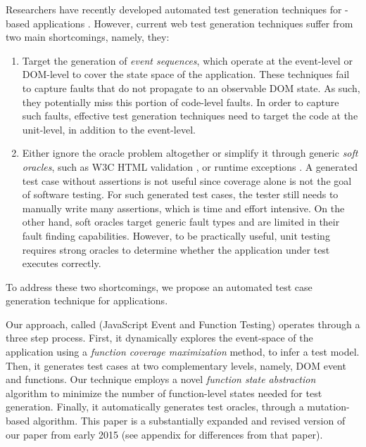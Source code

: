Researchers have recently developed automated test generation techniques for \javascript-based applications \cite{artzi:icse11, marchetto:search, tonella:icst08, mesbah:tse12, song:symb10}. However, current web test generation techniques suffer from two main  shortcomings, namely, they:

\begin{enumerate}%
\item Target the generation of \emph{event sequences}, which operate at the event-level or DOM-level to cover the state space of the application. These techniques fail to capture faults that  do not propagate to an observable DOM state. As such, they potentially miss this portion of code-level \javascript faults. In order to capture such faults, effective test generation techniques need to target the code at the \javascript unit-level, in addition to the event-level.
\item Either ignore the oracle problem altogether or simplify it through generic \emph{soft oracles}, such as  W3C HTML  validation \cite{artzi:icse11,mesbah:tse12}, or  \javascript runtime exceptions \cite{artzi:icse11}.
A generated test case without assertions is not useful since coverage alone is not the goal of software testing. For such generated test cases, the tester still needs to  manually write many assertions, which is time and effort intensive. 
On the other hand, soft oracles  target generic fault types and are limited in their fault finding capabilities.   %
However, to be practically useful, unit testing requires strong oracles  to determine whether the application under test executes correctly.
\end{enumerate}
To address these two shortcomings, we propose an automated test case  generation technique for \javascript applications. 

Our approach, called \tool (JavaScript Event and Function Testing) operates through a three step process. 
First, it dynamically explores the event-space of the application using a \emph{function coverage maximization} method, to infer a test model. Then, it generates test cases at two complementary levels, namely, DOM event and \javascript functions. Our technique employs a novel \emph{function state abstraction} algorithm to minimize the number of function-level states needed for test generation.
Finally,  it automatically generates test oracles, through a mutation-based algorithm. This paper is a substantially expanded and revised version of our paper from early 2015 \cite{mirshokraie:icst15} (see appendix for differences from that paper).

